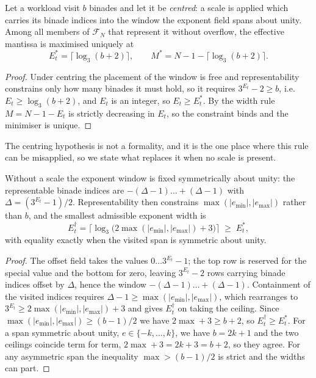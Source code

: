\begin{theorem}
\label{thm:optimal}
Let a workload visit $b$ binades and let it be \emph{centred}: a scale is applied
which carries its binade indices into the window the exponent field spans about
unity. Among all members of $\mathcal{F}_N$ that
represent it without overflow, the effective mantissa is maximised uniquely at
\[
  E_t^{*} = \bigl\lceil \log_3 (b+2) \bigr\rceil,
  \qquad
  M^{*} = N - 1 - \bigl\lceil \log_3 (b+2) \bigr\rceil .
\]
\end{theorem}
\begin{proof}
Under centring the placement of the window is free and representability
constrains only how many binades it must hold, so it requires $3^{E_t}-2 \ge b$,
i.e.\ $E_t \ge \log_3(b+2)$, and
$E_t$ is an integer, so $E_t \ge E_t^{*}$. By the width rule $M = N-1-E_t$ is
strictly decreasing in $E_t$, so the constraint binds and the minimiser is unique.
\end{proof}

The centring hypothesis is not a formality, and it is the one place where this
rule can be misapplied, so we state what replaces it when no scale is present.

\begin{proposition}
\label{prop:uncentred}
Without a scale the exponent window is fixed symmetrically about unity: the
representable binade indices are $-(\Delta-1) \dots +(\Delta-1)$ with
$\Delta = (3^{E_t}-1)/2$. Representability then constrains
$\max(|e_{\min}|,|e_{\max}|)$ rather than $b$, and the smallest admissible
exponent width is
\[
  E_t^{\dagger} = \bigl\lceil \log_3\bigl(2\max(|e_{\min}|,|e_{\max}|)+3\bigr) \bigr\rceil
  \;\ge\; E_t^{*},
\]
with equality exactly when the visited span is symmetric about unity.
\end{proposition}
\begin{proof}
The offset field takes the values $0 \dots 3^{E_t}-1$; the top row is reserved for
the special value and the bottom for zero, leaving $3^{E_t}-2$ rows carrying
binade indices offset by $\Delta$, hence the window $-(\Delta-1) \dots +(\Delta-1)$.
Containment of the visited indices requires $\Delta-1 \ge \max(|e_{\min}|,|e_{\max}|)$,
which rearranges to $3^{E_t} \ge 2\max(|e_{\min}|,|e_{\max}|)+3$ and gives
$E_t^{\dagger}$ on taking the ceiling. Since
$\max(|e_{\min}|,|e_{\max}|) \ge (b-1)/2$ we have $2\max+3 \ge b+2$, so
$E_t^{\dagger} \ge E_t^{*}$. For a span symmetric about unity,
$e \in \{-k,\dots,k\}$, we have $b=2k+1$ and the two ceilings coincide term
for term, $2\max+3 = 2k+3 = b+2$, so they agree. For any
asymmetric span the inequality $\max > (b-1)/2$ is strict and the widths can part.
\end{proof}

